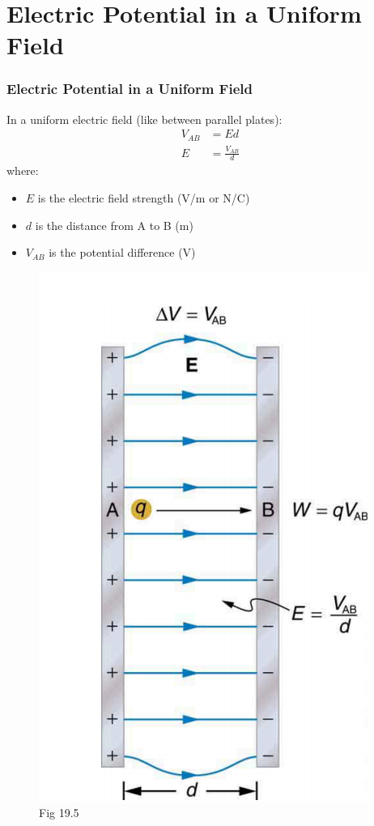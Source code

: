 \documentclass{beamer}
\begin{document}
\section{Electric Potential in a Uniform Field}

\begin{frame}
    \frametitle{Electric Potential in a Uniform Field}
    
    In a uniform electric field (like between parallel plates):
    \begin{align}
        V_{AB} &= Ed \\
        E &= \frac{V_{AB}}{d}
    \end{align}
    where:
    \begin{itemize}
        \item $E$ is the electric field strength (V/m or N/C)
        \item $d$ is the distance from A to B (m)
        \item $V_{AB}$ is the potential difference (V)
    \end{itemize}
    \end{frame}

\begin{frame}
    \begin{figure}
        \centering
        \includegraphics[width=0.4\linewidth]{plates.png}
        \caption{Fig 19.5}
    \end{figure}
\end{frame}
\end{document}
